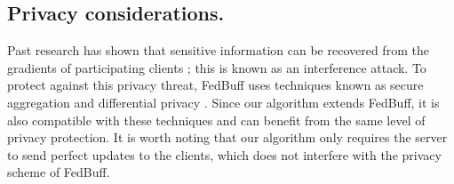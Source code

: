 \subsection{Privacy considerations.} \label{appsec:privacy}
Past research has shown that sensitive information can be recovered from the gradients of participating clients \cite{feature_leakage,inverting_gradients}; this is known as an interference attack.
To protect against this privacy threat, FedBuff uses techniques known as secure aggregation \cite{Cryptonite,SecAgg} and differential privacy \cite{practicalAndPrivate,learning_dp}.
Since our algorithm \algname extends FedBuff, it is also compatible with these techniques and can benefit from the same level of privacy protection.
It is worth noting that our algorithm only requires the server to send perfect updates to the clients, which does not interfere with the privacy scheme of FedBuff.

